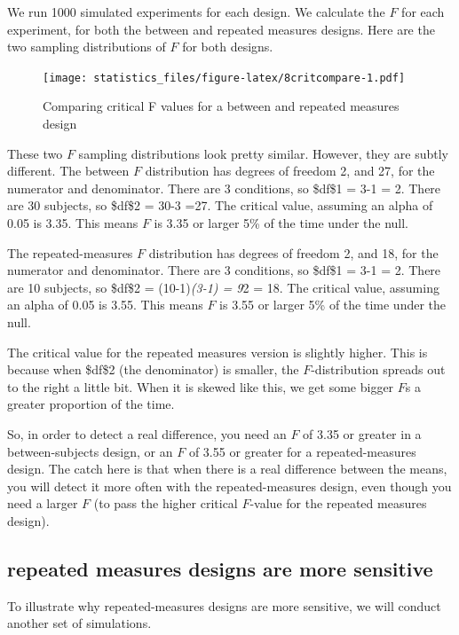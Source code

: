 \documentclass[]{book}
\begin{document}
We run 1000 simulated experiments for each design. We calculate the \(F\) for each experiment, for both the between and repeated measures designs. Here are the two sampling distributions of \(F\) for both designs.

\begin{figure}
\centering
\texttt{[image: statistics\_files/figure-latex/8critcompare-1.pdf]}
\caption{\label{fig:8critcompare}Comparing critical F values for a between and repeated measures design}
\end{figure}

These two \(F\) sampling distributions look pretty similar. However, they are subtly different. The between \(F\) distribution has degrees of freedom 2, and 27, for the numerator and denominator. There are 3 conditions, so \$df\$1 = 3-1 = 2. There are 30 subjects, so \$df\$2 = 30-3 =27. The critical value, assuming an alpha of 0.05 is 3.35. This means \(F\) is 3.35 or larger 5\% of the time under the null.

The repeated-measures \(F\) distribution has degrees of freedom 2, and 18, for the numerator and denominator. There are 3 conditions, so \$df\$1 = 3-1 = 2. There are 10 subjects, so \$df\$2 = (10-1)\emph{(3-1) = 9}2 = 18. The critical value, assuming an alpha of 0.05 is 3.55. This means \(F\) is 3.55 or larger 5\% of the time under the null.

The critical value for the repeated measures version is slightly higher. This is because when \$df\$2 (the denominator) is smaller, the \(F\)-distribution spreads out to the right a little bit. When it is skewed like this, we get some bigger \(F\)s a greater proportion of the time.

So, in order to detect a real difference, you need an \(F\) of 3.35 or greater in a between-subjects design, or an \(F\) of 3.55 or greater for a repeated-measures design. The catch here is that when there is a real difference between the means, you will detect it more often with the repeated-measures design, even though you need a larger \(F\) (to pass the higher critical \(F\)-value for the repeated measures design).

\hypertarget{repeated-measures-designs-are-more-sensitive}{%
\subsection{repeated measures designs are more sensitive}\label{repeated-measures-designs-are-more-sensitive}}

To illustrate why repeated-measures designs are more sensitive, we will conduct another set of simulations.
\end{document}
